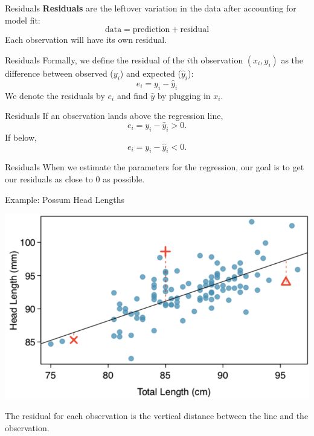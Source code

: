 \begin{frame}{Residuals}
    \textbf{Residuals} are the leftover variation in the data after accounting for model fit:
    \[
        \text{data} = \text{prediction} + \text{residual}
    \]
    Each observation will have its own residual.
\end{frame}

\begin{frame}{Residuals}
    Formally, we define the residual of the $i$th observation $(x_i,y_i)$ as the difference between observed ($y_i$) and expected ($\hat{y}_i$):
    \[
        e_i = y_i - \hat{y}_i
    \] 
    We denote the residuals by $e_i$ and find $\hat{y}$ by plugging in $x_i$.
\end{frame}

\begin{frame}{Residuals}
    If an observation lands above the regression line,
    \[
        e_i = y_i - \hat{y}_i > 0.
    \]
    If below,
    \[
        e_i = y_i - \hat{y}_i < 0.
    \]
\end{frame}

\begin{frame}{Residuals}
    When we estimate the parameters for the regression, our goal is to get our residuals as close to 0 as possible.
\end{frame}

\begin{frame}{Example: Possum Head Lengths}
    \begin{center}
        \includegraphics[scale=0.3]{images/possreg.png}
    \end{center}
    The residual for each observation is the vertical distance between the line and the observation. 
\end{frame}

